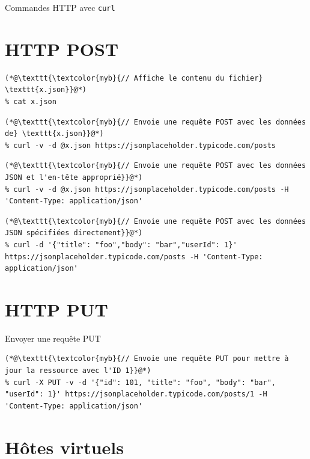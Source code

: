 \documentclass{report}
\begin{document}
\begin{multicols*}{3}
\begin{EExample}{Commandes HTTP avec \texttt{curl}  }{}
\end{EExample}


\section{HTTP POST}

\begin{lstlisting}
(*@\texttt{\textcolor{myb}{// Affiche le contenu du fichier} \texttt{x.json}}@*)
% cat x.json
\end{lstlisting}

\begin{lstlisting}
(*@\texttt{\textcolor{myb}{// Envoie une requête POST avec les données de} \texttt{x.json}}@*)
% curl -v -d @x.json https://jsonplaceholder.typicode.com/posts
\end{lstlisting}

\begin{lstlisting}
(*@\texttt{\textcolor{myb}{// Envoie une requête POST avec les données JSON et l'en-tête approprié}}@*)
% curl -v -d @x.json https://jsonplaceholder.typicode.com/posts -H 'Content-Type: application/json'
\end{lstlisting}

\begin{lstlisting}
(*@\texttt{\textcolor{myb}{// Envoie une requête POST avec les données JSON spécifiées directement}}@*)
% curl -d '{"title": "foo","body": "bar","userId": 1}' https://jsonplaceholder.typicode.com/posts -H 'Content-Type: application/json'
\end{lstlisting}

\section*{HTTP PUT}

\begin{EExample}{Envoyer une requête PUT}{}
\begin{lstlisting}
(*@\texttt{\textcolor{myb}{// Envoie une requête PUT pour mettre à jour la ressource avec l'ID 1}}@*)
% curl -X PUT -v -d '{"id": 101, "title": "foo", "body": "bar", "userId": 1}' https://jsonplaceholder.typicode.com/posts/1 -H 'Content-Type: application/json'
\end{lstlisting}
\end{EExample}


\section{Hôtes virtuels}


\end{multicols*}
\end{document}

